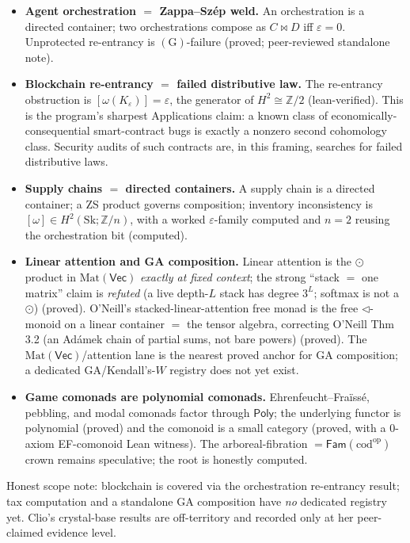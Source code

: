 \documentclass[11pt]{article}
\theoremstyle{definition}
\newcommand{\Poly}{\mathsf{Poly}}
\newcommand{\Vect}{\mathsf{Vec}}
\newcommand{\Fam}{\mathsf{Fam}}
\newcommand{\Z}{\mathbb{Z}}
\newcommand{\grade}[1]{{\small\textsf{(#1)}}}
\begin{document}
\begin{itemize}
\item \textbf{Agent orchestration $=$ Zappa--Szép weld.} An orchestration is a directed container;
two orchestrations compose as $C \bowtie D$ iff $\varepsilon = 0$. Unprotected re-entrancy is
$(\mathrm{G})$-failure \grade{proved; peer-reviewed standalone note}.

\item \textbf{Blockchain re-entrancy $=$ failed distributive law.} The re-entrancy obstruction is
$[\omega(K_\varepsilon)] = \varepsilon$, the generator of $H^2 \cong \Z/2$ \grade{lean-verified}.
This is the program's sharpest Applications claim: a known class of economically-consequential
smart-contract bugs is exactly a nonzero second cohomology class. Security audits of such
contracts are, in this framing, searches for failed distributive laws.

\item \textbf{Supply chains $=$ directed containers.} A supply chain is a directed container; a ZS
product governs composition; inventory inconsistency is $[\omega] \in H^2(\mathrm{Sk};\Z/n)$, with
a worked $\varepsilon$-family computed and $n=2$ reusing the orchestration bit
\grade{computed}.

\item \textbf{Linear attention and GA composition.} Linear attention is the $\odot$ product in
$\mathrm{Mat}(\Vect)$ \emph{exactly at fixed context}; the strong ``stack $=$ one matrix'' claim
is \emph{refuted} (a live depth-$L$ stack has degree $3^L$; softmax is not a $\odot$)
\grade{proved}. O'Neill's stacked-linear-attention free monad is the free $\lhd$-monoid on a linear
container $=$ the tensor algebra, correcting O'Neill Thm 3.2 (an Adámek chain of partial sums, not
bare powers) \grade{proved}. The $\mathrm{Mat}(\Vect)$/attention lane is the nearest proved anchor
for GA composition; a dedicated GA/Kendall's-$W$ registry does not yet exist.

\item \textbf{Game comonads are polynomial comonads.} Ehrenfeucht--Fraïssé, pebbling, and modal
comonads factor through $\Poly$; the underlying functor is polynomial \grade{proved} and the
comonoid is a small category \grade{proved, with a 0-axiom EF-comonoid Lean witness}. The
arboreal-fibration $= \Fam(\mathrm{cod}^{\mathrm{op}})$ crown remains \textsf{speculative}; the root
is honestly \textsf{computed}.
\end{itemize}

\noindent Honest scope note: blockchain is covered via the orchestration re-entrancy result; tax
computation and a standalone GA composition have \emph{no} dedicated registry yet. Clio's
crystal-base results are off-territory and recorded only at her \textsf{peer-claimed} evidence level.
\end{document}
